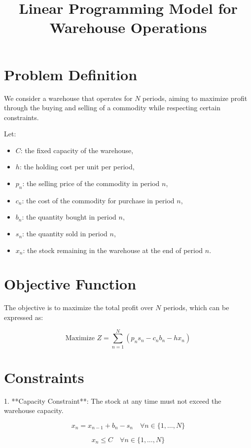 \documentclass{article}
\begin{document}
\title{Linear Programming Model for Warehouse Operations}
\author{}
\date{}
\maketitle

\section*{Problem Definition}

We consider a warehouse that operates for \(N\) periods, aiming to maximize profit through the buying and selling of a commodity while respecting certain constraints.

Let:
\begin{itemize}
    \item \(C\): the fixed capacity of the warehouse,
    \item \(h\): the holding cost per unit per period,
    \item \(p_n\): the selling price of the commodity in period \(n\),
    \item \(c_n\): the cost of the commodity for purchase in period \(n\),
    \item \(b_n\): the quantity bought in period \(n\),
    \item \(s_n\): the quantity sold in period \(n\),
    \item \(x_n\): the stock remaining in the warehouse at the end of period \(n\).
\end{itemize}

\section*{Objective Function}

The objective is to maximize the total profit over \(N\) periods, which can be expressed as:

\[
\text{Maximize } Z = \sum_{n=1}^{N} (p_n s_n - c_n b_n - h x_n)
\]

\section*{Constraints}

1. **Capacity Constraint**: The stock at any time must not exceed the warehouse capacity.

\[
x_n = x_{n-1} + b_n - s_n \quad \forall n \in \{1, \ldots, N\}
\]

\[
x_n \leq C \quad \forall n \in \{1, \ldots, N\}
\]
\end{document}
